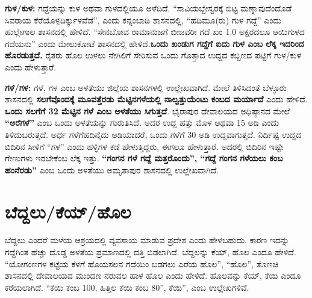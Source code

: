 \textbf{ಗುಳ/ಕುಳ:} ಗದ್ದೆಯನ್ನು ಕುಳ ಅಥವಾ ಗುಳದಲ್ಲಿಯೂ ಅಳೆದಿದೆ. “ಸಾವಿಯಬ್ಬೇಸ್ವರಕ್ಕೆ ಬಿಟ್ಟ ಮಣ್ನಾವುದೆಂದೊಡೆ ಸಿವರಾಯ ಕೆರೆಯೊಳ್ಪದಿರ್ಕ್ಕುಳವೆಡೆ”, ಎಂದು ಕನ್ನಂಬಾಡಿ ಶಾಸನದಲ್ಲಿ, “ಹದಿಮೂ(ರು) ಗುಳ ಗದ್ದೆ” ಎಂದು ಹುಲ್ಲೇಗಾಲ ಶಾಸನದಲ್ಲಿ ಹೇಳಿದೆ. “ಸೇನಬೋವ ರಾಮಾನುಜಗೆ ಬೀಜವರೀ ಗದೆ ಖಂ 1.0 ಅಕ್ಷರದಲೂ ಆಯಿಗುಳದ ಗದೆಯನು” ಎಂದು ಮೇಲುಕೋಟೆ ಶಾಸನದಲ್ಲಿ ಹೇಳಿದೆ.\textbf{ಒಂದು ಖಂಡುಗ ಗದ್ದೆಗೆ ಐದು ಗುಳ ಎಂಬ ಲೆಕ್ಕ ಇದರಿಂದ ಹೊರಡುತ್ತದೆ.} ರೈತರು ಹೊಲ ಉಳಲು ನೇಗಿಲಿಗೆ ಸೇರಿಸುವ ಒಂದು ಗೊತ್ತಾದ ಉದ್ದದ ಕಬ್ಬಿಣದ ಪಟ್ಟಿಗೆ ಗುಳ/ಕುಳ ಎಂದು ಹೇಳುತ್ತಾರೆ.

\textbf{ಗಳೆ/ಗಳ:} ಗಳೆ, ಗಳ ಎಂಬ ಅಳತೆಯು ಜಿಲ್ಲೆಯ ಶಾಸನಗಳಲ್ಲಿ ಉಲ್ಲೇಖವಾಗಿದೆ. ಮೇಲೆ ತಿಳಿಸಿದಂತೆ ಬೆಳ್ಳೂರು ಶಾಸನದಲ್ಲಿ \textbf{ಸಲಗೆವೊಂದಕ್ಕೆ ಮೂವತ್ತೆರಡು ಮೆಟ್ಟಿನಗಳೆಯಲ್ಲಿ ನಾಲ್ವತ್ತುಯೆಂಟು ಕಂಬದ ಮರ್ಯಾದೆ} ಎಂದು ಹೇಳಿದೆ. \textbf{ಒಂದು ಸಲಗೆಗೆ 32 ಮೆಟ್ಟಿನ ಗಳೆ ಎಂಬ ಅಳತೆಯು ಸಿಗುತ್ತದೆ}. ಭೈರಾಪುರ ದೇವಾಲಯದ ಅಧಿಷ್ಠಾನದ ಮೇಲೆ \textbf{“ಅರೆಗಳೆ”} ಎಂಬ ಒಂದು ಅಳತೆಯನ್ನು ಗುರುತಿಸಿದೆ. ಅದರ ಉದ್ದ ಹತ್ತು ಮೊಳ ಅಥವಾ 15 ಅಡಿ ಎಂದು ತಿಳಿದುಬರುತ್ತದೆ. ಅರ್ಧ ಗಳೆಗೆ\break ಹದಿನೈದು ಅಡಿಯಾದರೆ, ಒಂದು ಗಳೆಗೆ 30 ಅಡಿ ಉದ್ದವಾಗುತ್ತದೆ. ನಿರ್ದಿಷ್ಟ ಉದ್ದದ ಬಿದಿರಿನ ಸೀಳಿಗೆ “ಗಳ” ಎಂದು ಹಳ್ಳಿಗಳ ಕಡೆ ಹೇಳುತ್ತಿದ್ದರು, ಈಗಲೂ ಹೇಳುತ್ತಾರೆ. ಅದರಲ್ಲಿ ಬಿದಿರಿನ ಇಷ್ಟೇ ಗೇಣುಗಳು ಇರಬೇಕೆಂಬ ಲೆಕ್ಕ ಇತ್ತು. \textbf{“ಗಂಗನ ಗಳೆ ಗದ್ದೆ ಮತ್ತರೊಂದು”, “ಗದ್ದೆ ಗಂಗನ ಗಳೆಯಲು ಕಂಬ ಹಂನೆರಡು”} ಎಂಬ ಒಂದು ಅಳತೆಯು ಅಮೃತಾಪುರ ಶಾಸನದಲ್ಲಿ ಉಲ್ಲೇಖವಾಗಿದೆ.


\section*{ಬೆದ್ದಲು/ಕೆಯ್​/ಹೊಲ}

ಬೆದ್ದಲು ಎಂದರೆ ಮಳೆಯ ಆಶ್ರಯದಲ್ಲಿ ವ್ಯವಸಾಯ ಮಾಡುವ ಪ್ರದೇಶ ಎಂದು ಹೇಳಬಹುದು. ಕಾರಣ ಇದನ್ನು ಗದ್ದೆಗಿಂತ ಹೆಚ್ಚು ದೊಡ್ಡ ಅಳತೆಯ ಪ್ರಮಾಣದಲ್ಲಿ ದತ್ತಿ ಬಿಡಲಾಗಿದೆ. ಬೆದ್ದಲನ್ನು ಕೆಯ್​, ಹೊಲ ಎಂದೂ ಹೇಳಿದೆ. “ಯೋಗಂಣಗಳ ಕಟ್ಟೆಯ ಕೆಳಗೆ ಹೊಯಸಲನ ಗದೆಯಿಂ ಬಡಗಲು ಎರೆಯ ಹೊಲ”, “ಹೊಲ”, ತೊಣಚಿ ಶಾಸನದಲ್ಲಿ ದೇವಾಲಯದ ಮುಂದಣ ನರುವಲ ಹಾಳ ಹೊಲ ಎಂದು ಹೇಳಿದೆ. ಹೊಲವನ್ನು ಕೆಯ್​, ಕೆಯಿ ಎಂದೂ ಕರೆಯಲಾಗಿದೆ. “ಕೆಯಿ ಕಂಬ 100, ಹಿತ್ತಿಲ ಕೆಯಿ ಕಂಬ 80”, ಕೆಯಿ”, ಎಂಬ ಉಲ್ಲೇಖಗಳಿವೆ.

